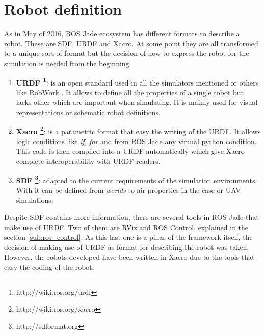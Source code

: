 \section{Robot definition} %
\label{sec:robot_definition}
As in May of 2016, ROS Jade ecosystem has different formats to describe a robot.
These are SDF, URDF and Xacro.
At some point they are all transformed to a unique sort of format but the decision of how to express the robot for the simulation is needed from the beginning.


\begin{enumerate}
  \item \textbf{URDF \footnote{http://wiki.ros.org/urdf}}: is an open standard used in all the simulators mentioned or others like RobWork \cite{robwork}. 
  It allows to define all the properties of a single robot but lacks other which are important when simulating. 
  It is mainly used for visual representations or schematic robot definitions.
  \item \textbf{Xacro \footnote{http://wiki.ros.org/xacro}}: is a parametric format that easy the writing of the URDF.
  It allows logic conditions like \textit{if, for} and from ROS Jade any virtual python condition.
  This code is then compiled into a URDF automatically which give Xacro complete interoperability with URDF readers.
  \item \textbf{SDF \footnote{http://sdformat.org}}: adapted to the current requirements of the simulation environments.
  With it can be defined from \textit{worlds} to air properties in the case or UAV simulations.
\end{enumerate}

Despite SDF contains more information, there are several tools in ROS Jade that make use of URDF.
Two of them are RViz and ROS Control, explained in the section \ref{sub:ros_control}.
As this last one is a pillar of the framework itself, the decision of making use of URDF as format for describing the robot was taken.
However, the robots developed have been written in Xacro due to the tools that easy the coding of the robot.
